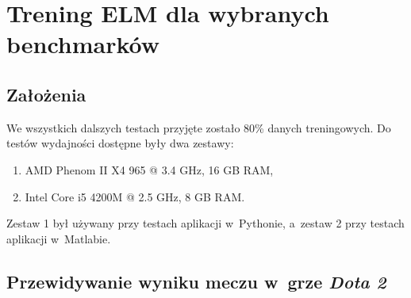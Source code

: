 \documentclass[pl]{minipw} %
\begin{document}
\chapter{Trening ELM dla wybranych benchmarków}
\section{Założenia}
We wszystkich dalszych testach przyjęte zostało 80\% danych treningowych. Do testów wydajności dostępne były dwa zestawy:
\begin{enumerate}
\item AMD Phenom II X4 965 @ 3.4 GHz, 16 GB RAM,
\item Intel Core i5 4200M @ 2.5 GHz, 8 GB RAM.
\end{enumerate}
Zestaw 1 był używany przy testach aplikacji w~Pythonie, a~zestaw 2 przy testach aplikacji w~Matlabie.
\section{Przewidywanie wyniku meczu w~grze \textit{Dota 2}}
\end{document}
